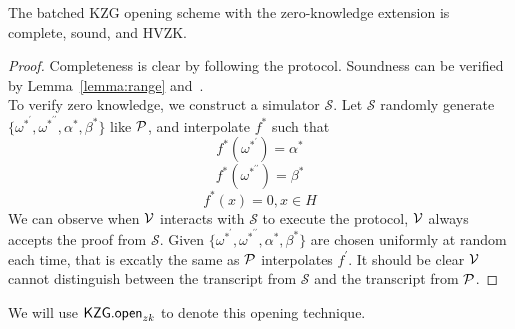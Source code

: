 \begin{theorem}
The batched KZG opening scheme with the zero-knowledge extension is complete, sound, and HVZK.
\end{theorem}
\begin{proof}
Completeness is clear by following the protocol. Soundness can be verified by Lemma~\ref{lemma:range} and~\cite{plonk}. \\
To verify zero knowledge, we construct a simulator $\mathcal{S}$. Let $\mathcal{S}$ randomly generate $\{\omega^{*^\prime},\omega^{*^{\prime\prime}},\alpha^*,\beta^*\}$ like $\mathcal{P}$, and interpolate $f^*$ such that
\[ f^*(\omega^{*^\prime})=\alpha^* \]
\[ f^*(\omega^{*^{\prime\prime}})=\beta^* \]
\[ f^*(x)=0,x\in{H} \]
We can observe when $\mathcal{V}$ interacts with $\mathcal{S}$ to execute the protocol, $\mathcal{V}$ always accepts the proof from $\mathcal{S}$. Given $\{\omega^{*^\prime},\omega^{*^{\prime\prime}},\alpha^*,\beta^*\}$ are chosen uniformly at random each time, that is excatly the same as $\mathcal{P}$ interpolates $f^\prime$. It should be clear $\mathcal{V}$ cannot distinguish between the transcript from $\mathcal{S}$ and the transcript from $\mathcal{P}$.
\end{proof}
We will use $\mathsf{KZG.open}_{zk}$ to denote this opening technique.

